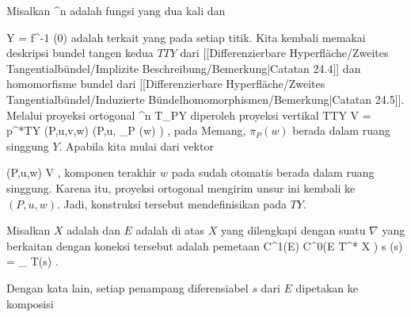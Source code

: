 {}
{

Misalkan
 {\R^n } { \R
} {}
adalah fungsi yang dua kali
dan

\mavergleichskette
{\vergleichskette
{ Y
}
{ = }{ f^{-1} (0)
}
{  }{
}
{    }{
}
{   }{
}
}
{}{}{}
adalah
terkait yang
pada setiap titik. Kita kembali memakai deskripsi bundel tangen kedua $TTY$ dari
[[Differenzierbare Hyperfläche/Zweites Tangentialbündel/Implizite Beschreibung/Bemerkung|Catatan 24.4]]
dan homomorfisme bundel dari
[[Differenzierbare Hyperfläche/Zweites Tangentialbündel/Induzierte Bündelhomomorphismen/Bemerkung|Catatan 24.5]].
Melalui proyeksi ortogonal
\maabb {} {\R^n } { T_PY
} {}
diperoleh proyeksi vertikal
\maabbeledisp {} {TTY} { V = p^*TY
} {(P,u,v,w)} { (P,u, \pi_P (w) )
} {,}
pada
Memang, $\pi_P(w)$ berada dalam ruang singgung $Y$. Apabila kita mulai dari vektor

\mavergleichskette
{\vergleichskette
{ (P,u,w)
}
{ \in }{ V
}
{  }{
}
{    }{
}
{   }{
}
}
{}{}{,}
komponen terakhir $w$ pada
 sudah otomatis berada dalam ruang singgung. Karena itu, proyeksi ortogonal mengirim unsur ini kembali ke $(P,u,w)$. Jadi, konstruksi tersebut mendefinisikan
pada $TY$.

}


{}
{

Misalkan $X$ adalah
dan $E$ adalah
di atas $X$ yang dilengkapi dengan suatu
$\nabla$ yang berkaitan dengan koneksi tersebut adalah pemetaan
\maabbeledisp {\nabla} {C^1(E)} { C^0(E \otimes T^* X )
} { s } { \nabla(s) = \pi_{ }  \circ T(s)
} {.}

}
Dengan kata lain, setiap penampang diferensiabel $s$ dari $E$
 {} {}
dipetakan ke komposisi

 {  }

